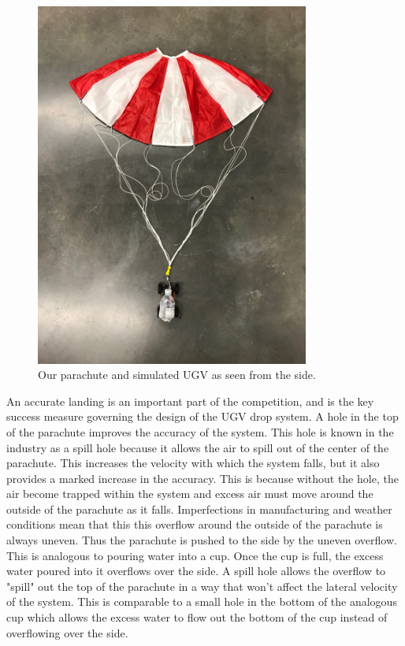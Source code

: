 \documentclass[]{auvsi_doc}
\begin{document}
\begin{figure}[h]
\centering
\includegraphics[width=90mm]{./figs/Parachute_Side.jpg}
\caption{Our parachute and simulated UGV as seen from the side.}
\label{fig:side}
\end{figure}

An accurate landing is an important part of the competition, and is the key success measure governing the design of the UGV drop system.
A hole in the top of the parachute improves the accuracy of the system.
This hole is known in the industry as a spill hole because it allows the air to spill out of the center of the parachute. 
This increases the velocity with which the system falls, but it also provides a marked increase in the accuracy.
This is because without the hole, the air become trapped within the system and excess air must move around the outside of the parachute as it falls.
Imperfections in manufacturing and weather conditions mean that this this overflow around the outside of the  parachute is always uneven. Thus the parachute is pushed to the side by the uneven overflow. This is analogous to pouring water into a cup. Once the cup is full, the excess water poured into it overflows over the side. A spill hole allows the overflow to "spill" out the top of the parachute in a way that won't affect the lateral velocity of the system. This is comparable to a small hole in the bottom of the analogous cup which allows the excess water to flow out the bottom of the cup instead of overflowing over the side. 
\end{document}
